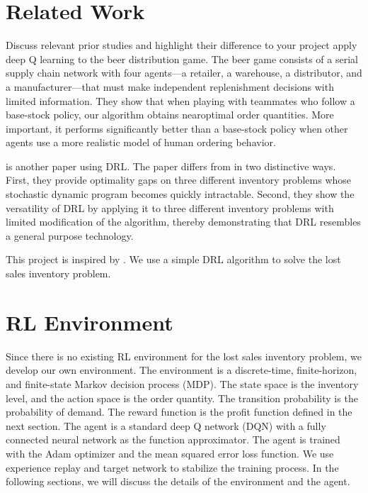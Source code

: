 \section{Related Work}
Discuss relevant prior studies and highlight their difference to your project
\citet{oroojlooyjadid_deep_2022} apply deep Q learning to the beer distribution game. The beer game consists of a serial supply chain network with four agents—a retailer, a warehouse, a distributor, and a manufacturer—that must make independent replenishment decisions with limited information. They show that when playing with teammates who follow a base-stock policy, our algorithm obtains nearoptimal order quantities. More important, it performs significantly better than a base-stock policy when other agents use a more realistic model of human ordering behavior.

\citet{gijsbrechts_can_2022} is another paper using DRL. The paper differs from \citet{oroojlooyjadid_deep_2022} in two distinctive ways. First, they provide optimality gaps on three different inventory problems whose stochastic dynamic program becomes quickly intractable. Second, they show the versatility of DRL by applying it to three different inventory problems with limited modification of the algorithm, thereby demonstrating that DRL resembles a general purpose technology.

This project is inspired by \citet{gijsbrechts_can_2022}. We use a simple DRL algorithm to solve the lost sales inventory problem.


\section{RL Environment}
Since there is no existing RL environment for the lost sales inventory problem, we develop our own environment. The environment is a discrete-time, finite-horizon, and finite-state Markov decision process (MDP). The state space is the inventory level, and the action space is the order quantity. The transition probability is the probability of demand. The reward function is the profit function defined in the next section. The agent is a standard deep Q network (DQN) with a fully connected neural network as the function approximator. The agent is trained with the Adam optimizer and the mean squared error loss function. We use experience replay and target network to stabilize the training process. In the following sections, we will discuss the details of the environment and the agent.

